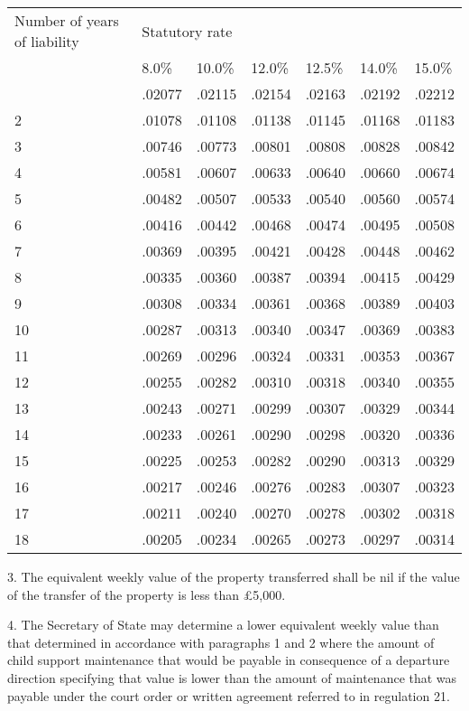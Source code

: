 \documentclass[a4paper]{article}
\begin{document}
\noindent
\begin{longtable}{p{96.00522pt} lll lll}
\hline
Number of years of liability&\multicolumn{6}{l}{Statutory rate}\\
& 8.0\%&10.0\%&12.0\%&12.5\%&14.0\%&15.0\%\\
\hline
\endhead
\hline
\endlastfoot
1&.02077&.02115&.02154&.02163&.02192&.02212\\
2&.01078&.01108&.01138&.01145&.01168&.01183\\
3&.00746&.00773&.00801&.00808&.00828&.00842\\
4&.00581&.00607&.00633&.00640&.00660&.00674\\
5&.00482&.00507&.00533&.00540&.00560&.00574\\
6&.00416&.00442&.00468&.00474&.00495&.00508\\
7&.00369&.00395&.00421&.00428&.00448&.00462\\
8&.00335&.00360&.00387&.00394&.00415&.00429\\
9&.00308&.00334&.00361&.00368&.00389&.00403\\
10&.00287&.00313&.00340&.00347&.00369&.00383\\
11&.00269&.00296&.00324&.00331&.00353&.00367\\
12&.00255&.00282&.00310&.00318&.00340&.00355\\
13&.00243&.00271&.00299&.00307&.00329&.00344\\
14&.00233&.00261&.00290&.00298&.00320&.00336\\
15&.00225&.00253&.00282&.00290&.00313&.00329\\
16&.00217&.00246&.00276&.00283&.00307&.00323\\
17&.00211&.00240&.00270&.00278&.00302&.00318\\
18&.00205&.00234&.00265&.00273&.00297&.00314\\
\end{longtable}


\medskip

3.
The equivalent weekly value of the property transferred shall be nil if the
value of the transfer of the property is less than £5,000.

\medskip

4. The Secretary of State may determine a lower equivalent weekly value than
that determined in accordance with paragraphs 1 and 2 where the amount of child
support maintenance that would be payable in consequence of a departure
direction specifying that value is lower than the amount of maintenance that was
payable under the court order or written agreement referred to in regulation 21.
\end{document}
